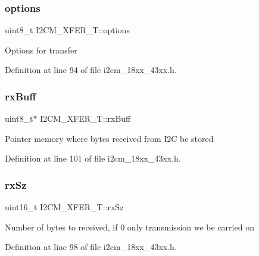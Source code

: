 \subsubsection{\texorpdfstring{options}{options}}
{\footnotesize\ttfamily uint8\+\_\+t I2\+C\+M\+\_\+\+X\+F\+E\+R\+\_\+\+T\+::options}

Options for transfer 

Definition at line 94 of file i2cm\+\_\+18xx\+\_\+43xx.\+h.

\mbox{\label{struct_i2_c_m___x_f_e_r___t_a8005cf7efb0ff7ed4d7951c963b0eaa5}} 
\subsubsection{\texorpdfstring{rx\+Buff}{rxBuff}}
{\footnotesize\ttfamily uint8\+\_\+t$\ast$ I2\+C\+M\+\_\+\+X\+F\+E\+R\+\_\+\+T\+::rx\+Buff}

Pointer memory where bytes received from I2C be stored 

Definition at line 101 of file i2cm\+\_\+18xx\+\_\+43xx.\+h.

\mbox{\label{struct_i2_c_m___x_f_e_r___t_a3258d00dfd77755e7d2b397d87746733}} 
\subsubsection{\texorpdfstring{rx\+Sz}{rxSz}}
{\footnotesize\ttfamily uint16\+\_\+t I2\+C\+M\+\_\+\+X\+F\+E\+R\+\_\+\+T\+::rx\+Sz}

Number of bytes to received, if 0 only transmission we be carried on 

Definition at line 98 of file i2cm\+\_\+18xx\+\_\+43xx.\+h.

\mbox{\label{struct_i2_c_m___x_f_e_r___t_a674496757553522628b725c4de372c59}} 
